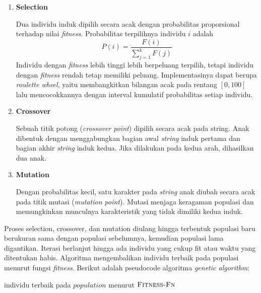 \begin{enumerate}
    \item \textbf{Selection} 
    
    Dua individu induk dipilih secara acak dengan probabilitas proporsional terhadap nilai \textit{fitness}. Probabilitas terpilihnya individu $i$ adalah
    \begin{equation}
        P(i) = \frac{F(i)}{\sum_{j=1}^{k} F(j)}
    \end{equation}
    Individu dengan \textit{fitness} lebih tinggi lebih berpeluang terpilih, tetapi individu dengan \textit{fitness} rendah tetap memiliki peluang. Implementasinya dapat berupa \textit{roulette wheel}, yaitu membangkitkan bilangan acak pada rentang $[0,100]$ lalu mencocokkannya dengan interval kumulatif probabilitas setiap individu.
    \item \textbf{Crossover} 
    
    Sebuah titik potong (\textit{crossover point}) dipilih secara acak pada string. Anak dibentuk dengan menggabungkan bagian awal \textit{string} induk pertama dan bagian akhir \textit{string} induk kedua. Jika dilakukan pada kedua arah, dihasilkan dua anak.
    \item \textbf{Mutation} 
    
    Dengan probabilitas kecil, satu karakter pada \textit{string} anak diubah secara acak pada titik mutasi (\textit{mutation point}). Mutasi menjaga keragaman populasi dan memungkinkan munculnya karakteristik yang tidak dimiliki kedua induk.
\end{enumerate}

Proses selection, crossover, dan mutation diulang hingga terbentuk populasi baru berukuran sama dengan populasi sebelumnya, kemudian populasi lama digantikan. Iterasi berlanjut hingga ada individu yang cukup fit atau waktu yang ditentukan habis. Algoritma mengembalikan individu terbaik pada populasi menurut fungsi \textit{fitness}. Berikut adalah pseudocode algoritma \textit{genetic algorithm}:

\begin{algorithm}[H]
\caption{Genetic Algorithm}
\label{alg:genetic-algorithm}
\KwRet individu terbaik pada $population$ menurut $\textsc{Fitness-Fn}$\;
\end{algorithm}
